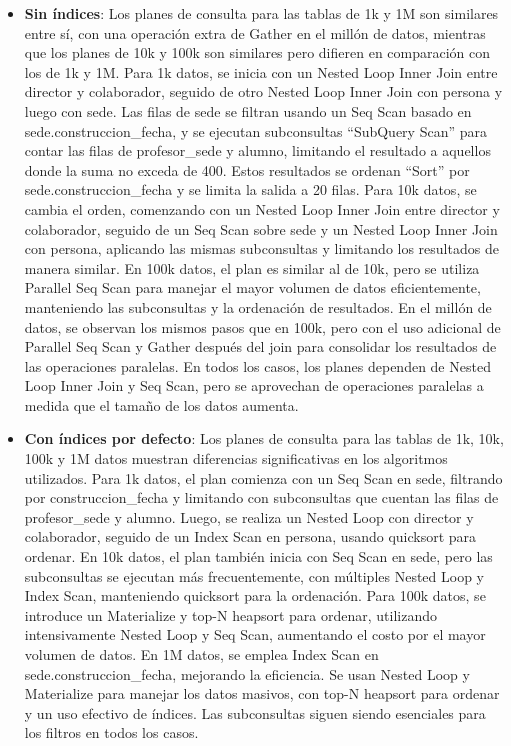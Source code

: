 \begin{itemize}
\begin{itemize}
		      \item {\textbf{Sin índices}: Los planes de consulta para las tablas de 1k y 1M son similares entre sí, con una operación extra de Gather en el millón de datos, mientras que los planes de 10k y 100k son similares pero difieren en comparación con los de 1k y 1M. Para 1k datos, se inicia con un Nested Loop Inner Join entre director y colaborador, seguido de otro Nested Loop Inner Join con persona y luego con sede. Las filas de sede se filtran usando un Seq Scan basado en sede.construccion\_fecha, y se ejecutan subconsultas ``SubQuery Scan'' para contar las filas de profesor\_sede y alumno, limitando el resultado a aquellos donde la suma no exceda de 400. Estos resultados se ordenan ``Sort'' por sede.construccion\_fecha y se limita la salida a 20 filas. Para 10k datos, se cambia el orden, comenzando con un Nested Loop Inner Join entre director y colaborador, seguido de un Seq Scan sobre sede y un Nested Loop Inner Join con persona, aplicando las mismas subconsultas y limitando los resultados de manera similar. En 100k datos, el plan es similar al de 10k, pero se utiliza Parallel Seq Scan para manejar el mayor volumen de datos eficientemente, manteniendo las subconsultas y la ordenación de resultados. En el millón de datos, se observan los mismos pasos que en 100k, pero con el uso adicional de Parallel Seq Scan y Gather después del join para consolidar los resultados de las operaciones paralelas. En todos los casos, los planes dependen de Nested Loop Inner Join y Seq Scan, pero se aprovechan de operaciones paralelas a medida que el tamaño de los datos aumenta.}
		      \item {\textbf{Con índices por defecto}: Los planes de consulta para las tablas de 1k, 10k, 100k y 1M datos muestran diferencias significativas en los algoritmos utilizados. Para 1k datos, el plan comienza con un Seq Scan en sede, filtrando por construccion\_fecha y limitando con subconsultas que cuentan las filas de profesor\_sede y alumno. Luego, se realiza un Nested Loop con director y colaborador, seguido de un Index Scan en persona, usando quicksort para ordenar. En 10k datos, el plan también inicia con Seq Scan en sede, pero las subconsultas se ejecutan más frecuentemente, con múltiples Nested Loop y Index Scan, manteniendo quicksort para la ordenación. Para 100k datos, se introduce un Materialize y top-N heapsort para ordenar, utilizando intensivamente Nested Loop y Seq Scan, aumentando el costo por el mayor volumen de datos. En 1M datos, se emplea Index Scan en sede.construccion\_fecha, mejorando la eficiencia. Se usan Nested Loop y Materialize para manejar los datos masivos, con top-N heapsort para ordenar y un uso efectivo de índices. Las subconsultas siguen siendo esenciales para los filtros en todos los casos.}

\end{itemize}
\end{itemize}
